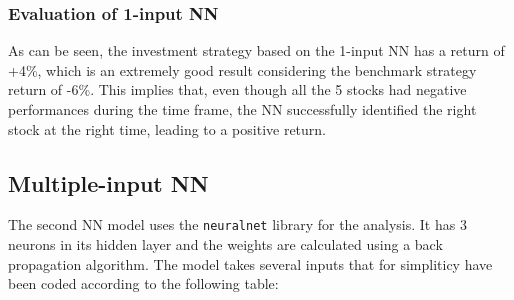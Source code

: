 \documentclass[
  11pt,
]{article}
\begin{document}
\hypertarget{evaluation-of-1-input-nn}{%
\subsubsection{Evaluation of 1-input
NN}\label{evaluation-of-1-input-nn}}

As can be seen, the investment strategy based on the 1-input NN has a
return of +4\%, which is an extremely good result considering the
benchmark strategy return of -6\%. This implies that, even though all
the 5 stocks had negative performances during the time frame, the NN
successfully identified the right stock at the right time, leading to a
positive return.

\hypertarget{multiple-input-nn}{%
\subsection{Multiple-input NN}\label{multiple-input-nn}}

The second NN model uses the \texttt{neuralnet} library for the
analysis. It has 3 neurons in its hidden layer and the weights are
calculated using a back propagation algorithm. The model takes several
inputs that for simpliticy have been coded according to the following
table:
\end{document}
